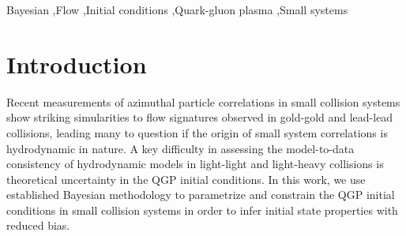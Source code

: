 \documentclass[3p,times,procedia]{elsarticle}
\begin{document}
\begin{frontmatter}
\begin{keyword}
  Bayesian \sep Flow \sep Initial conditions \sep Quark-gluon plasma \sep Small systems


\end{keyword}

\end{frontmatter}


\section{Introduction}

Recent measurements of azimuthal particle correlations in small collision systems show striking simularities to flow signatures observed in gold-gold and lead-lead collisions, leading many to question if the origin of small system correlations is hydrodynamic in nature.
A key difficulty in assessing the model-to-data consistency of hydrodynamic models in light-light and light-heavy collisions is theoretical uncertainty in the QGP initial conditions.
In this work, we use established Bayesian methodology \cite{Higdon:2008cmc} to parametrize and constrain the QGP initial conditions in small collision systems in order to infer initial state properties with reduced bias.
\end{document}
